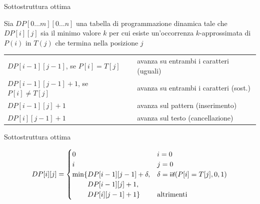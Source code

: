 \begin{frame}{Sottostruttura ottima}

\vspace{-6pt}
\begin{myboxtitle}[Definizione]
Sia $DP[0 \ldots m][0 \ldots n]$ una tabella di programmazione dinamica
tale che $DP[i][j]$ sia il minimo valore $k$ per cui esiste un'occorrenza $k$-approssimata di $P(i)$ in $T(j)$ che termina nella posizione $j$
\end{myboxtitle}

\small
\smallskip
\begin{tabular}{ll}
$DP[i-1][j-1]$, se $P[i] = T[j]$ &	avanza su entrambi i caratteri (uguali) \\
$DP[i-1][j-1]+1$, se $P[i] \neq T[j]$ &	avanza su entrambi i caratteri  (\alert{sost.}) \\
$DP[i-1][j]+1$				& avanza sul pattern (\alert{inserimento})\\
$DP[i][j-1]+1$				& avanza sul testo (\alert{cancellazione})\\
\end{tabular}

\end{frame}

\begin{frame}{Sottostruttura ottima}

\vspace{-6pt}
\[
DP[i][j] = \begin{cases}
0  & \textrm{$i=0$}\\
i  & \textrm{$j=0$}\\
\min\{ DP[i-1][j-1] + \delta, & \delta = \textsf{{\small iif}}(P[i]=T[j],0,1)\\
\qquad\, DP[i-1][j] + 1,\\ 
\qquad\, DP[i][j-1] + 1\} & \textrm{altrimenti}
\end{cases}
\]

\begin{center}
\end{center}

\end{frame}

